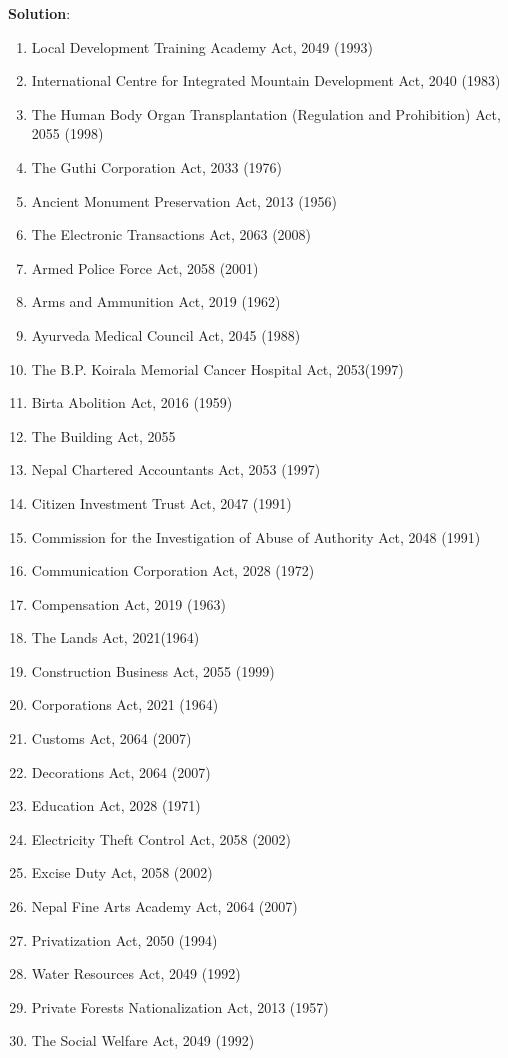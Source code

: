 \documentclass[
  openany]{book}
\newenvironment{solution}{ {\bfseries Solution}:}{}
\begin{document}
\begin{questions}
\begin{solution}
\begin{enumerate}
\item Local Development Training Academy Act, 2049 (1993)
\item International Centre for Integrated Mountain Development Act, 2040 (1983)
\item The Human Body Organ Transplantation (Regulation and Prohibition) Act, 2055 (1998)
\item The Guthi Corporation Act, 2033 (1976)
\item Ancient Monument Preservation Act, 2013 (1956)
\item The Electronic Transactions Act, 2063 (2008)
\item Armed Police Force Act, 2058 (2001)
\item Arms and Ammunition Act, 2019 (1962)
\item Ayurveda Medical Council Act, 2045 (1988)
\item The B.P. Koirala Memorial Cancer Hospital Act, 2053(1997)
\item Birta Abolition Act, 2016 (1959)
\item The Building Act, 2055
\item Nepal Chartered Accountants Act, 2053 (1997)
\item Citizen Investment Trust Act, 2047 (1991)
\item Commission for the Investigation of Abuse of Authority Act, 2048 (1991)
\item Communication Corporation Act, 2028 (1972)
\item Compensation Act, 2019 (1963)
\item The Lands Act, 2021(1964)
\item Construction Business Act, 2055 (1999)
\item Corporations Act, 2021 (1964)
\item Customs Act, 2064 (2007)
\item Decorations Act, 2064 (2007)
\item Education Act, 2028 (1971)
\item Electricity Theft Control Act, 2058 (2002)
\item Excise Duty Act, 2058 (2002)
\item Nepal Fine Arts Academy Act, 2064 (2007)
\item Privatization Act, 2050 (1994)
\item Water Resources Act, 2049 (1992)
\item Private Forests Nationalization Act, 2013 (1957)
\item The Social Welfare Act, 2049 (1992)

\end{enumerate}
\end{solution}
\end{questions}
\end{document}

